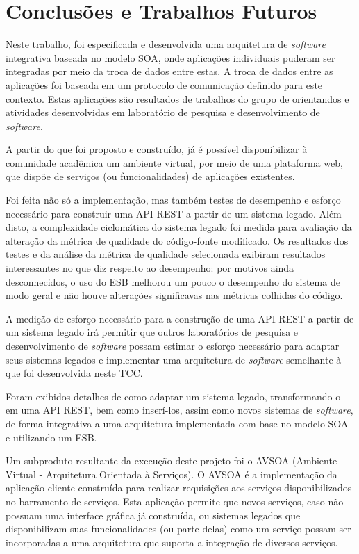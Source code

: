 \chapter[Conclusões e Trabalhos Futuros]{Conclusões e Trabalhos Futuros}

Neste trabalho, foi especificada e desenvolvida uma arquitetura de \textit{software} integrativa baseada no modelo SOA, onde aplicações individuais puderam ser integradas por meio da troca de dados entre estas. A troca de dados entre as aplicações foi baseada em um protocolo de comunicação definido para este contexto. Estas aplicações são resultados de trabalhos do grupo de orientandos e atividades desenvolvidas em laboratório de pesquisa e desenvolvimento de \textit{software}.

A partir do que foi proposto e construído, já é possível disponibilizar à comunidade acadêmica um ambiente virtual, por meio de uma plataforma web, que dispõe de serviços (ou funcionalidades) de aplicações existentes.

Foi feita não só a implementação, mas também testes de desempenho e esforço necessário para construir uma API REST a partir de um sistema legado. Além disto, a complexidade ciclomática do sistema legado foi medida para avaliação da alteração da métrica de qualidade do código-fonte modificado. Os resultados dos testes e da análise da métrica de qualidade selecionada exibiram resultados interessantes no que diz respeito ao desempenho: por motivos ainda desconhecidos, o uso do ESB melhorou um pouco o desempenho do sistema de modo geral e não houve alterações significavas nas métricas colhidas do código.

A medição de esforço necessário para a construção de uma API REST a partir de um sistema legado irá permitir que outros laboratórios de pesquisa e desenvolvimento de \textit{software} possam estimar o esforço necessário para adaptar seus sistemas legados e implementar uma arquitetura de \textit{software} semelhante à que foi desenvolvida neste TCC.

Foram exibidos detalhes de como adaptar um sistema legado, transformando-o em uma API REST, bem como inserí-los, assim como novos sistemas de \textit{software}, de forma integrativa a uma arquitetura implementada com base no modelo SOA e utilizando um ESB.

Um subproduto resultante da execução deste projeto foi o AVSOA (Ambiente Virtual - Arquitetura Orientada à Serviços). O AVSOA é a implementação da aplicação cliente construída para realizar requisições aos serviços disponibilizados no barramento de serviços. Esta aplicação permite que novos serviços, caso não possuam uma interface gráfica já construída, ou sistemas legados que disponibilizam suas funcionalidades (ou parte delas) como um serviço possam ser incorporadas a uma arquitetura que suporta a integração de diversos serviços.

